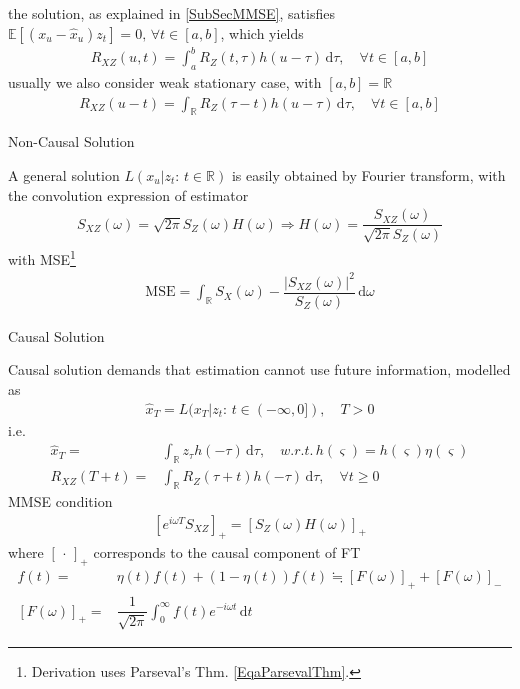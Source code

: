 the solution, as explained in \autoref{SubSecMMSE}, satisfies $ \mathbb{E}\left[ (x_u-\hat{x}_u)z_t \right] =0,\,\forall t\in[a,b] $, which yields
\begin{align}
    R_{XZ}(u,t)=\int _a^b R_Z(t,\tau)h(u-\tau) \,\mathrm{d}\tau,\quad \forall t\in[a,b]
\end{align}
usually we also consider weak stationary case, with $ [a,b]=\mathbb{R} $
\begin{align}
    R_{XZ}(u-t)=\int_\mathbb{R} R_Z(\tau -t)h(u-\tau)  \,\mathrm{d}\tau ,\quad \forall t\in[a,b]
\end{align}


\begin{point}
    Non-Causal Solution
\end{point}
A general solution $ L(x_u|z_t:\,t\in\mathbb{R}) $ is easily obtained by Fourier transform, with the convolution expression of estimator
\begin{align}
    S_{XZ }(\omega )= \sqrt{2\pi}S_Z(\omega )H(\omega )\Rightarrow H(\omega )=\dfrac{S_{XZ} (\omega )}{\sqrt{2\pi}S_Z(\omega )}
\end{align}
with MSE\footnote{Derivation uses Parseval's Thm. \autoref{EqaParsevalThm}.}
\begin{align}
    \mathrm{MSE}=\int _\mathbb{R} S_X(\omega )-\dfrac{|S_{XZ}(\omega )|^2}{S_Z(\omega )} \,\mathrm{d}\omega   
\end{align}

\begin{point}
    Causal Solution
\end{point}

Causal solution demands that estimation cannot use future information, modelled as
\begin{align*}
    \hat{x}_{T}=L(x_T|z_t:\,t\in(-\infty, 0]),\quad T>0 
\end{align*}
i.e. 
\begin{align*}
    \hat{x}_T=&\int _\mathbb{R} z_\tau h(-\tau) \,\mathrm{d}\tau ,\quad w.r.t.\, h(\varsigma)=h(\varsigma)\eta(\varsigma) \\
    R_{XZ}(T+t)=&\int _\mathbb{R}R_Z(\tau+t)h(-\tau) \,\mathrm{d}\tau ,\quad \forall t\geq 0
\end{align*}
MMSE condition
\begin{align*}
    \left[ e^{i\omega T}S_{XZ}\right]_+ = \left[S_Z(\omega )H(\omega ) \right]_+
\end{align*}
where $[\, \cdot \, ]_+ $ corresponds to the causal component of FT
\begin{align*}
     f(t)=&\eta(t)f(t)+(1-\eta(t))f(t)\fallingdotseq [F(\omega )]_+ + [F(\omega )]_-\\
    [F(\omega )]_+=&\dfrac{1}{\sqrt{2\pi}}\int _0^\infty f(t)e^{-i\omega t} \,\mathrm{d}t
\end{align*}

